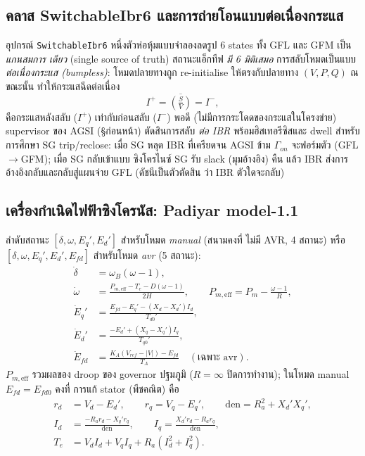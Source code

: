 \documentclass[12pt,a4paper]{article}
\begin{document}
\subsection{คลาส SwitchableIbr6 และการถ่ายโอนแบบต่อเนื่องกระแส}
อุปกรณ์ \texttt{SwitchableIbr6} หนึ่งตัวห่อหุ้มแบบจำลองลดรูป 6 states ทั้ง GFL และ GFM เป็น \emph{แกนสมการ
เดียว} (single source of truth) สถานะแอ็กทีฟ \emph{มี 6 มิติเสมอ} การสลับโหมดเป็นแบบ \emph{ต่อเนื่องกระแส
(bumpless)}: โหมดปลายทางถูก re-initialise ให้ตรงกับปลายทาง $(V,P,Q)$ ณ ขณะนั้น ทำให้กระแสฉีดต่อเนื่อง
\begin{equation}
I^{+} = \overline{\left(\tfrac{S}{V}\right)} = I^{-},
\end{equation}
คือกระแสหลังสลับ ($I^+$) เท่ากับก่อนสลับ ($I^-$) พอดี (ไม่มีการกระโดดของกระแสในโครงข่าย) supervisor ของ
AGSI (\S ก่อนหน้า) ตัดสินการสลับ \emph{ต่อ IBR} พร้อมฮิสเทอรีซิสและ dwell สำหรับการศึกษา SG trip/reclose:
เมื่อ SG หลุด IBR ที่เครียดจน AGSI ข้าม $\Gamma_{on}$ จะฟอร์มตัว (GFL$\to$GFM); เมื่อ SG กลับเข้าแบบ
ซิงโครไนซ์ SG รับ slack (มุมอ้างอิง) คืน แล้ว IBR ส่งการอ้างอิงกลับและกลับสู่แผนจ่าย GFL (ดัชนีเป็นตัวตัดสิน
ว่า IBR ตัวใดจะกลับ)

\subsection{เครื่องกำเนิดไฟฟ้าซิงโครนัส: Padiyar model-1.1}
ลำดับสถานะ $[\delta,\omega,E_q',E_d']$ สำหรับโหมด \emph{manual} (สนามคงที่ ไม่มี AVR, 4 สถานะ) หรือ
$[\delta,\omega,E_q',E_d',E_{fd}]$ สำหรับโหมด \emph{avr} (5 สถานะ):
\begin{align}
\dot{\delta} &= \omega_B(\omega-1),\\
\dot{\omega} &= \frac{P_{m,\mathrm{eff}}-T_e-D(\omega-1)}{2H},\qquad
                P_{m,\mathrm{eff}}=P_m-\frac{\omega-1}{R},\\
\dot{E}_q' &= \frac{E_{fd}-E_q'-(X_d-X_d')I_d}{T_{d0}'},\\
\dot{E}_d' &= \frac{-E_d'+(X_q-X_q')I_q}{T_{q0}'},\\
\dot{E}_{fd} &= \frac{K_A(V_{ref}-|V|)-E_{fd}}{T_A}\quad(\text{เฉพาะ avr}).
\end{align}
$P_{m,\mathrm{eff}}$ รวมผลของ droop ของ governor ปฐมภูมิ ($R=\infty$ ปิดการทำงาน); ในโหมด manual
$E_{fd}=E_{fd0}$ คงที่ การแก้ stator (พีชคณิต) คือ
\begin{align}
r_d &= V_d-E_d',\qquad r_q = V_q-E_q',\qquad \mathrm{den}=R_a^2+X_d'X_q',\\
I_d &= \frac{-R_a r_d - X_q' r_q}{\mathrm{den}},\qquad
      I_q = \frac{X_d' r_d - R_a r_q}{\mathrm{den}},\\
T_e &= V_d I_d+V_q I_q+R_a(I_d^2+I_q^2).
\end{align}
\end{document}
